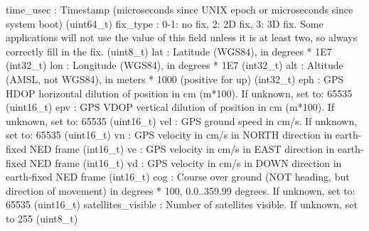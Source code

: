 \begin{DoxyVerb}
\begin{DoxyVerb}
\begin{DoxyVerb}
time_usec                 : Timestamp (microseconds since UNIX epoch or microseconds since system boot) (uint64_t)
fix_type                  : 0-1: no fix, 2: 2D fix, 3: 3D fix. Some applications will not use the value of this field unless it is at least two, so always correctly fill in the fix. (uint8_t)
lat                       : Latitude (WGS84), in degrees * 1E7 (int32_t)
lon                       : Longitude (WGS84), in degrees * 1E7 (int32_t)
alt                       : Altitude (AMSL, not WGS84), in meters * 1000 (positive for up) (int32_t)
eph                       : GPS HDOP horizontal dilution of position in cm (m*100). If unknown, set to: 65535 (uint16_t)
epv                       : GPS VDOP vertical dilution of position in cm (m*100). If unknown, set to: 65535 (uint16_t)
vel                       : GPS ground speed in cm/s. If unknown, set to: 65535 (uint16_t)
vn                        : GPS velocity in cm/s in NORTH direction in earth-fixed NED frame (int16_t)
ve                        : GPS velocity in cm/s in EAST direction in earth-fixed NED frame (int16_t)
vd                        : GPS velocity in cm/s in DOWN direction in earth-fixed NED frame (int16_t)
cog                       : Course over ground (NOT heading, but direction of movement) in degrees * 100, 0.0..359.99 degrees. If unknown, set to: 65535 (uint16_t)
satellites_visible        : Number of satellites visible. If unknown, set to 255 (uint8_t)\end{DoxyVerb}
 \mbox{\label{classpymavlink_1_1dialects_1_1v10_1_1MAVLink_a4ee91a7e40aee7dfd7a92e4888465d0e}} 

\end{DoxyVerb}
\end{DoxyVerb}
